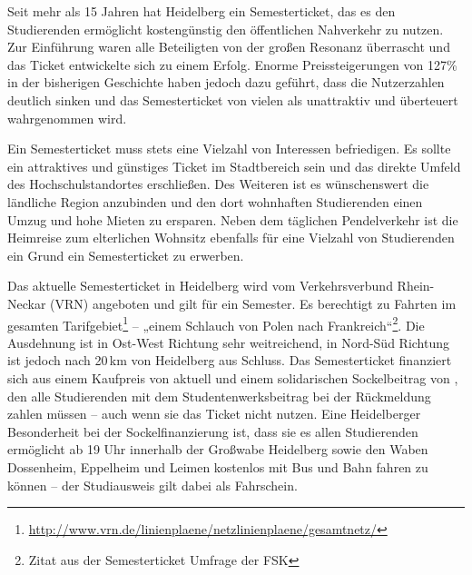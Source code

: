 % 
% 

Seit mehr als 15 Jahren hat Heidelberg ein Semesterticket, das es den
Studierenden ermöglicht kostengünstig den öffentlichen Nahverkehr zu nutzen.
Zur Einführung waren alle Beteiligten von der großen Resonanz überrascht und
das Ticket entwickelte sich zu einem Erfolg.  Enorme Preissteigerungen von
127\% in der bisherigen Geschichte haben jedoch dazu geführt, dass die
Nutzerzahlen deutlich sinken und das Semesterticket von vielen als unattraktiv
und überteuert wahrgenommen wird.

Ein Semesterticket muss stets eine Vielzahl von Interessen befriedigen. Es
sollte ein attraktives und günstiges Ticket im Stadtbereich sein und das
direkte Umfeld des Hochschulstandortes erschließen. Des Weiteren ist es
wünschenswert die ländliche Region anzubinden und den dort wohnhaften
Studierenden einen Umzug und hohe Mieten zu ersparen. Neben dem täglichen
Pendelverkehr ist die Heimreise zum elterlichen Wohnsitz ebenfalls für eine
Vielzahl von Studierenden ein Grund ein Semesterticket zu erwerben.

Das aktuelle Semesterticket in Heidelberg wird vom Verkehrsverbund Rhein-Neckar
(VRN) angeboten und gilt für ein Semester. Es berechtigt zu Fahrten im gesamten
Tarifgebiet\footnote{\url{http://www.vrn.de/linienplaene/netzlinienplaene/gesamtnetz/}}
-- „einem Schlauch von Polen nach Frankreich“\footnote{Zitat aus der
Semesterticket Umfrage der FSK}. Die Ausdehnung ist in Ost-West Richtung sehr
weitreichend, in Nord-Süd Richtung ist jedoch nach 20\,km von Heidelberg aus
Schluss. Das Semesterticket finanziert sich aus einem Kaufpreis von aktuell
\EUR{\semesterticket} und einem solidarischen Sockelbeitrag von
\EUR{\sockelbeitrag}, den alle Studierenden mit dem Studentenwerksbeitrag bei
der Rückmeldung zahlen müssen -- auch wenn sie das Ticket nicht nutzen. Eine
Heidelberger Besonderheit bei der Sockelfinanzierung ist, dass sie es allen
Studierenden ermöglicht ab 19 Uhr innerhalb der Großwabe Heidelberg sowie den
Waben Dossenheim, Eppelheim und Leimen kostenlos mit Bus und Bahn fahren zu
können -- der Studiausweis gilt dabei als Fahrschein.

